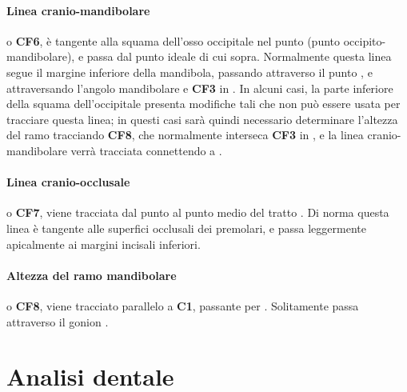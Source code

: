 \paragraph{Linea cranio-mandibolare} o \textbf{CF6}, è tangente alla squama dell'osso occipitale nel punto  (punto occipito-mandibolare), e passa dal punto  ideale di cui sopra. Normalmente questa linea segue il margine inferiore della mandibola, passando attraverso il punto , e attraversando l'angolo mandibolare e \textbf{CF3} in . In alcuni casi, la parte inferiore della squama dell'occipitale presenta modifiche tali che non può essere usata per tracciare questa linea; in questi casi sarà quindi necessario determinare l'altezza del ramo tracciando \textbf{CF8}, che normalmente interseca \textbf{CF3} in , e la linea cranio-mandibolare verrà tracciata connettendo  a .


\paragraph{Linea cranio-occlusale} o \textbf{CF7}, viene tracciata dal punto  al punto medio del tratto . Di norma questa linea è tangente alle superfici occlusali dei premolari, e passa leggermente apicalmente ai margini incisali inferiori.

\paragraph{Altezza del ramo mandibolare} o \textbf{CF8}, viene tracciato parallelo a \textbf{C1}, passante per . Solitamente passa attraverso il gonion .

\section{Analisi dentale}
